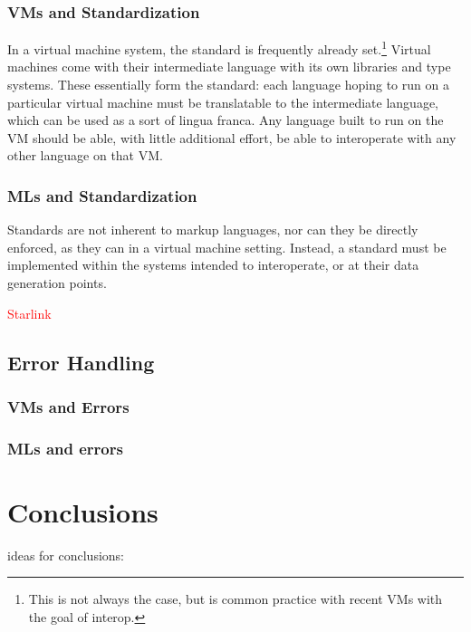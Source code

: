 \documentclass{sig-alternate}
\newcommand{\mycomment}[1]{\textcolor{red}{#1}}
\begin{document}
\subsubsection*{VMs and Standardization}
In a virtual machine system, the standard is frequently already set.\footnote{This is not always the case, but is common practice with recent VMs with the goal of interop.} Virtual machines come with their intermediate language with its own libraries and type systems. These essentially form the standard: each language hoping to run on a particular virtual machine must be translatable to the intermediate language, which can be used as a sort of lingua franca. Any language built to run on the VM should be able, with little additional effort, be able to interoperate with any other language on that VM.


\subsubsection*{MLs and Standardization}
Standards are not inherent to markup languages, nor can they be directly enforced, as they can in a virtual machine setting. Instead, a standard must be implemented within the systems intended to interoperate, or at their data generation points.

\mycomment{Starlink}



\subsection{Error Handling}\label{errors}

\subsubsection*{VMs and Errors}

\subsubsection*{MLs and errors}



\section{Conclusions}
ideas for conclusions:
\end{document}
